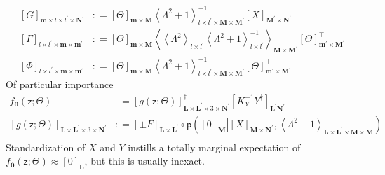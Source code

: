 \documentclass[preprint,12pt]{elsarticle}
\newcommand*{\M}[1]{\ensuremath{#1}\xspace}
\newcommand*{\x}{\times}
\newcommand*{\mi}[1]{\mathbf{#1}}
\newcommand*{\rv}[1]{\mathsf{#1}}
\newcommand*{\te}[2][]{\left\lbrack{#2}\right\rbrack_{#1}}
\newcommand*{\diag}[2][]{\left\langle{#2}\right\rangle_{#1}}
\newcommand*{\prob}[3]{\M{\mathsf{p}\!\left(\left.{#1}\right\vert{#2,#3}\right)}}
\newcommand*{\deq}{\M{\mathrel{\mathop:}=}}
\begin{document}
            \begin{equation*}
                \begin{aligned}
                    \te[\mi{m}\x l\x l^{\prime}\x\mi{N^{\prime}}]{G} &\deq 
                    \te[\mi{m}\x\mi{M}]{\Theta} \diag[l\x l^{\prime}\x\mi{M}\x\mi{M^{\prime}}]{\Lambda^{2}+1}^{-1} \te[\mi{M^{\prime}}\x\mi{N^{\prime}}]{X}
                     \\
                    \te[l\x l^{\prime}\x\mi{m}\x\mi{m}^{\prime}]{\Gamma} &\deq 
                    \te[\mi{m}\x\mi{M}]{\Theta} 
                    \diag[\mi{M}\x\mi{M^{\prime}}]
                    {\diag[l\x l^{\prime}]{\Lambda^{2}} 
                    \diag[l\x l^{\prime}]{\Lambda^{2}+1}^{-1}} 
                    \te[\mi{m}^{\prime}\x\mi{M^{\prime}}]{\Theta}^{\intercal} \\
                    \te[l\x l^{\prime}\x\mi{m}\x\mi{m^{\prime}}]{\Phi} &\deq \te[\mi{m}\x\mi{M}]{\Theta}
                    \diag[l\x l^{\prime}\x\mi{M}\x\mi{M^{\prime}}]{\Lambda^{2}+1}^{-1} \te[\mi{m^{\prime}}\x\mi{M^{\prime}}]{\Theta}^{\intercal}
                \end{aligned}
            \end{equation*}
            Of particular importance
            \begin{equation*}
                \begin{aligned}
                    f_{\mi{0}}({\rv{z}}; \Theta)
                    &\phantom{:}= \te[\mi{L}\x\mi{L^{\prime}}\x 3 \x\mi{N^{\prime}}]{g({\rv{z}}; \Theta)}^{\dagger}
                    \te[\mi{L^{\prime}N^{\prime}}]{K_{Y}^{-1} Y^{\dagger}} \\
                    \te[\mi{L}\x\mi{L^{\prime}}\x 3 \x\mi{N^{\prime}}]{g({\rv{z}}; \Theta)} 
                    &\deq
                    \te[\mi{L}\x\mi{L^{\prime}}]{\pm F} \circ 
                    \prob{\te[\mi{M}]{0}}{\te[\mi{M}\x\mi{N^{\prime}}]{X}}
                    {\diag[\mi{L}\x\mi{L^{\prime}}\x\mi{M}\x\mi{M}]{\Lambda^{2}+1}} \\
                \end{aligned}                    
            \end{equation*}
            Standardization of $X$ and $Y$ instills a totally marginal expectation of $f_{\mi{0}}({\rv{z}}; \Theta) \approx \te[\mi{L}]{0}$, but this is usually inexact.
\end{document}
